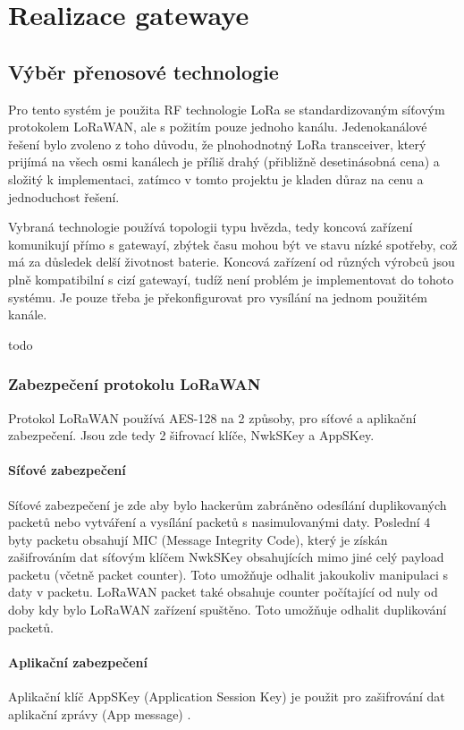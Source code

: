 \chapter{Realizace gatewaye}

\section{Výběr přenosové technologie}
Pro tento systém je použita RF technologie LoRa se standardizovaným síťovým protokolem LoRaWAN, ale s požitím pouze jednoho kanálu.
Jedenokanálové řešení bylo zvoleno z toho důvodu, že plnohodnotný LoRa transceiver, který prijímá na všech osmi kanálech je příliš drahý (přibližně desetinásobná cena) a složitý k implementaci, zatímco v tomto projektu je kladen důraz na cenu a jednoduchost řešení.

Vybraná technologie používá topologii typu hvězda, tedy koncová zařízení komunikují přímo s gatewayí, zbýtek času mohou být ve stavu nízké spotřeby, což má za důsledek delší životnost baterie.
Koncová zařízení od různých výrobců jsou plně kompatibilní s cizí gatewayí, tudíž není problém je implementovat do tohoto systému. Je pouze třeba je překonfigurovat pro vysílání na jednom použitém kanále.

todo

\subsection{Zabezpečení protokolu LoRaWAN}
Protokol LoRaWAN používá AES-128 na 2 způsoby, pro síťové a aplikační zabezpečení. Jsou zde tedy 2 šifrovací klíče, NwkSKey a AppSKey.

\subsubsection{Síťové zabezpečení}
Síťové zabezpečení je zde aby bylo hackerům zabráněno odesílání duplikovaných packetů nebo vytváření a vysílání packetů s nasimulovanými daty.
Poslední 4 byty packetu obsahují MIC (Message Integrity Code), který je získán zašifrováním dat síťovým klíčem NwkSKey obsahujících mimo jiné celý payload packetu (včetně packet counter). Toto umožňuje odhalit jakoukoliv manipulaci s daty v packetu. LoRaWAN packet také obsahuje counter počítající od nuly od doby kdy bylo LoRaWAN zařízení spuštěno. Toto umožňuje odhalit duplikování packetů.


\subsubsection{Aplikační zabezpečení}
Aplikační klíč AppSKey (Application Session Key) je použit pro zašifrování dat aplikační zprávy (App message) \cite{lwSpec} \cite{lwSecur}.


